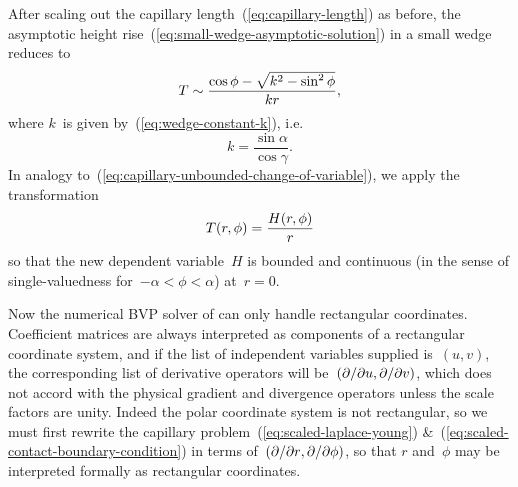 After scaling out the capillary length~(\ref{eq:capillary-length})
as before,
the asymptotic height rise~(\ref{eq:small-wedge-asymptotic-solution})
in a small wedge reduces to
\begin{equation}
  T \sim \frac{\cos\phi - \sqrt{k^2 - \sin^2 \phi}}{k r},
  \label{eq:small-wedge-scaled-asymptotic-solution}
\end{equation}
where $k$~is given by~(\ref{eq:wedge-constant-k}), i.e.
\begin{equation}
  k = \frac{\sin\alpha}{\cos\gamma}.
  \label{eq:small-wedge-constant-k}
\end{equation}
In analogy to~(\ref{eq:capillary-unbounded-change-of-variable}),
we apply the transformation
\begin{equation}
  \savecontent{
    T (r, \phi) = \frac{H (r, \phi)}{r}
  }{eq:small-wedge-change-of-variable}
\end{equation}
so that the new dependent variable~$H$ is bounded and continuous
(in the sense of single-valuedness for~$-\alpha < \phi < \alpha$)
at~$r = 0$.

Now the numerical BVP solver of 
can only handle rectangular coordinates.
Coefficient matrices are always interpreted
as components of a rectangular coordinate system,
and if the list of independent variables supplied is~$(u, v)$,
the corresponding list of derivative operators
will be~$(\mathop{}\!\partial / {\mathop{}\!\partial u}, \mathop{}\!\partial / {\mathop{}\!\partial v})$,
which does not accord with
the physical gradient and divergence operators
unless the scale factors are unity.
Indeed the polar coordinate system is not rectangular,
so we must first rewrite the capillary problem~(\ref{eq:scaled-laplace-young})
\&~(\ref{eq:scaled-contact-boundary-condition})
in terms of~$(\mathop{}\!\partial / {\mathop{}\!\partial r}, \mathop{}\!\partial / {\mathop{}\!\partial\phi})$,
so that $r$ and~$\phi$ may be interpreted formally
as rectangular coordinates.

